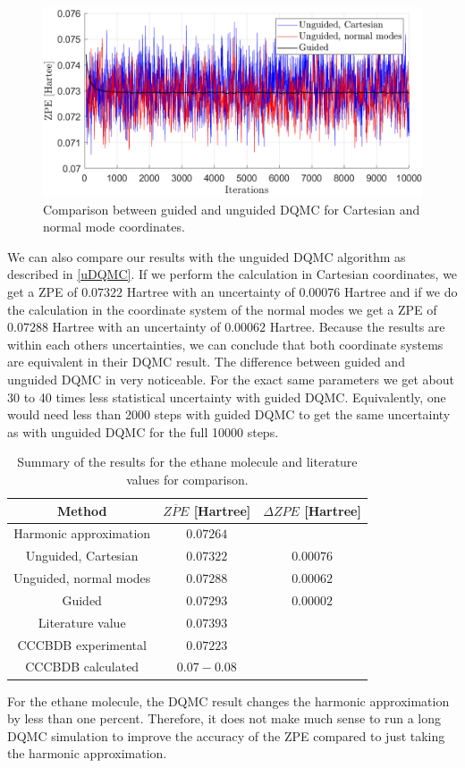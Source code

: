 \documentclass [12pt]{report}
\begin{document}
\begin{figure}[h!]
\includegraphics[width=\linewidth] {c2h6_2.png}
\caption{Comparison between guided and unguided DQMC for Cartesian and normal mode coordinates.} \label{c2h6_2}
\end{figure}
We can also compare our results with the unguided DQMC algorithm as described in \ref{uDQMC}. If we perform the calculation in Cartesian coordinates, we get a ZPE of $0.07322$ Hartree with an uncertainty of $0.00076$ Hartree and if we do the calculation in the coordinate system of the normal modes we get a ZPE of $0.07288$ Hartree with an uncertainty of $0.00062$ Hartree. Because the results are within each others uncertainties, we can conclude that both coordinate systems are equivalent in their DQMC result. The difference between guided and unguided DQMC in very noticeable. For the exact same parameters we get about 30 to 40 times less statistical uncertainty with guided DQMC. Equivalently, one would need less than 2000 steps with guided DQMC to get the same uncertainty as with unguided DQMC for the full 10000 steps.

\begin{table}[h]
\centering
 \begin{tabular}{||c | c | c||} 
 \hline
 Method & $\overline{ZPE}$ [Hartree] & $\Delta ZPE$ [Hartree] \\ [0.5ex] 
 \hline\hline
 Harmonic approximation & $0.07264$ & \\
 \hline
 Unguided, Cartesian & $0.07322$ &  $0.00076$\\
  \hline
 Unguided, normal modes & $0.07288$ &  $0.00062$\\
 \hline
 Guided & $0.07293$ & $0.00002$ \\
 \hline
 Literature value \cite{c2h6} & $0.07393$ &\\
 \hline
 CCCBDB experimental \cite{cccbdb} & $0.07223$ & \\
 \hline
 CCCBDB calculated \cite{cccbdb} & $0.07 - 0.08$ & \\
 \hline
\end{tabular}
\caption{Summary of the results for the ethane molecule and literature values for comparison.}
\end{table}
For the ethane molecule, the DQMC result  changes the harmonic approximation by less than one percent. Therefore, it does not make much sense to run a long DQMC simulation to improve the accuracy of the ZPE compared to just taking the harmonic approximation.
\newpage
\end{document}
